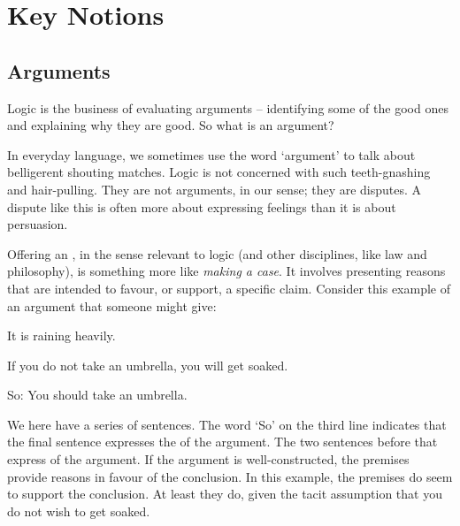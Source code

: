 

\part{Key Notions}
\label{ch.intro}


\chapter{Arguments}\label{argRaining}\label{s:Arguments}
Logic is the business of evaluating arguments – identifying some of the good ones and explaining why they are good. So what is an argument?

In everyday language, we sometimes use the word ‘argument’ to talk about belligerent shouting matches. Logic is not concerned with such teeth-gnashing and hair-pulling. They are not arguments, in our sense; they are disputes. A dispute like this is often more about expressing feelings than it is about  persuasion. 

Offering an , in the sense relevant to logic (and other disciplines, like law and philosophy), is something more like \emph{making a case}. It involves presenting reasons that are intended to favour, or support, a specific claim. Consider this example of an argument that someone might give:
	\begin{earg}
		\item[] It is raining heavily.
		\item[] If you do not take an umbrella, you will get soaked.
		\item[So:] You should take an umbrella.
	\end{earg}
We here have a series of sentences. The word `So' on the third line indicates that the final sentence expresses the  of the argument. The two sentences before that express  of the argument. If the argument is well-constructed, the premises provide reasons in favour of the conclusion. In this example, the premises do seem to support the conclusion. At least they do, given the tacit assumption that you do not wish to get soaked. 

